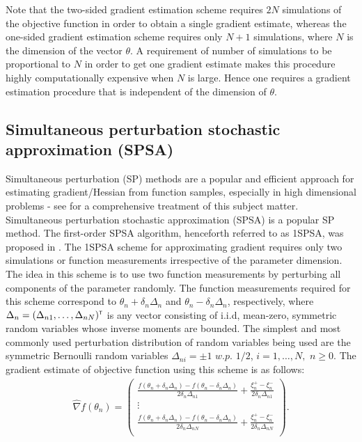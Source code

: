 Note that the  two-sided gradient estimation scheme requires $2N$ simulations of the objective function in order to obtain a single gradient estimate, whereas the one-sided gradient estimation scheme requires only $N+1$ simulations, where $N$ is the dimension of the vector $\theta$. A requirement of number of simulations to be proportional to $N$ in order to get one gradient estimate makes this procedure highly computationally expensive when $N$ is large. Hence one requires a gradient estimation procedure that is independent of the dimension of $\theta$.
\subsection{Simultaneous perturbation stochastic approximation (SPSA)}
Simultaneous perturbation (SP) methods are a popular and efficient approach for estimating gradient/Hessian from function samples, especially in high dimensional problems - see \cite{bhatnagar-book} for a comprehensive treatment of this subject matter. Simultaneous perturbation stochastic approximation (SPSA) is a popular SP method. The first-order SPSA algorithm, henceforth referred to as 1SPSA, was proposed in \cite{spall2005introduction}. The 1SPSA scheme for approximating gradient requires only two simulations or function measurements irrespective of the parameter dimension. The idea in this scheme is to use two function measurements by perturbing all components of the parameter randomly. The function measurements required for this scheme correspond to $\theta_n + \delta_n \Delta_n$ and $\theta_n - \delta_n \Delta_n$, respectively, where $\Delta_n = (\Delta_{n1},\ldots,\Delta_{nN})^\mathsf{\scriptscriptstyle T}$ is any vector consisting of i.i.d, mean-zero, symmetric random variables whose inverse moments are bounded. The simplest and most commonly used perturbation distribution of random variables being used are the symmetric Bernoulli random variables $\Delta_{ni} = \pm 1 \,\,w.p.\,\,1/2$, $i=1,\ldots,N,\,\, n\ge 0$. The gradient estimate of objective function using this scheme is as follows:
\begin{align}\label{eq:spsa}
 \widehat{\nabla} f(\theta_{n}) = \left(
\begin{array}{c}
\frac{f(\theta_n+\delta_n \Delta_n)-f(\theta_n-\delta_n \Delta_n)}{2\delta_n \Delta_{n1}} + \frac{\xi_{n}^+ - \xi_{n}^-}{2\delta_n \Delta_{n1}}\\
\vdots\\
\frac{f(\theta_n+\delta_n \Delta_n)-f(\theta_n-\delta_n \Delta_n)}{2\delta_n \Delta_{nN}} +  \frac{\xi_{n}^+ - \xi_{n}^-}{2\delta_n \Delta_{nN}}\\
\end{array}
\right).
\end{align}
